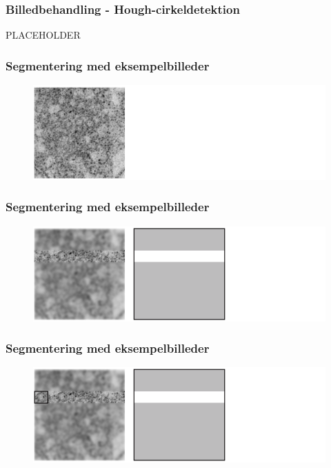 \documentclass[12pt,t]{beamer}
\begin{document}
\begin{frame}
\frametitle{Billedbehandling - Hough-cirkeldetektion}
PLACEHOLDER
\end{frame}

\begin{frame}
\frametitle{Segmentering med eksempelbilleder}
\begin{figure}[H]
\includegraphics[scale=0.35]{img/afstand/3.png}
\end{figure}
\end{frame}

\begin{frame}
\frametitle{Segmentering med eksempelbilleder}
\begin{figure}[H]
\includegraphics[scale=0.35]{img/afstand/4.png}
\end{figure}
\end{frame}

\begin{frame}
\frametitle{Segmentering med eksempelbilleder}
\begin{figure}[H]
\includegraphics[scale=0.35]{img/afstand/5.png}
\end{figure}
\end{frame}
\end{document}
